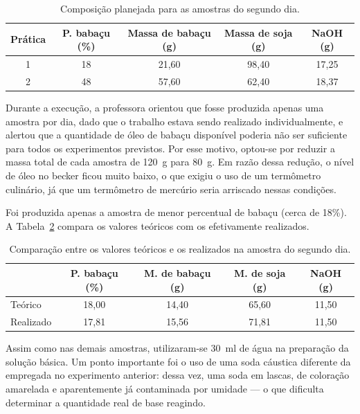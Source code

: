 \begin{table}[H]
    \centering
    \footnotesize
    \caption{Composição planejada para as amostras do segundo dia.}
    \label{tab:dia2_planejado}
    \begin{tabular}{ccccc}
        \toprule
        \textbf{Prática} & \textbf{P. babaçu (\%)} & \textbf{Massa de babaçu (g)} & \textbf{Massa de soja (g)} & \textbf{NaOH (g)} \\
        \midrule
        1 & 18 & 21,60 & 98,40 & 17,25 \\
        2 & 48 & 57,60 & 62,40 & 18,37 \\
        \bottomrule
    \end{tabular}
\end{table}

Durante a execução, a professora orientou que fosse produzida apenas uma amostra por dia, dado que o trabalho estava sendo realizado individualmente, e alertou que a quantidade de óleo de babaçu disponível poderia não ser suficiente para todos os experimentos previstos. Por esse motivo, optou-se por reduzir a massa total de cada amostra de 120~g para 80~g. Em razão dessa redução, o nível de óleo no becker ficou muito baixo, o que exigiu o uso de um termômetro culinário, já que um termômetro de mercúrio seria arriscado nessas condições.

Foi produzida apenas a amostra de menor percentual de babaçu (cerca de 18\%). A Tabela~\ref{tab:dia2_comparacao} compara os valores teóricos com os efetivamente realizados.

\begin{table}[H]
    \centering
    \footnotesize
    \caption{Comparação entre os valores teóricos e os realizados na amostra do segundo dia.}
    \label{tab:dia2_comparacao}
    \begin{tabular}{lcccc}
        \toprule
        & \textbf{P. babaçu (\%)} & \textbf{M. de babaçu (g)} & \textbf{M. de soja (g)} & \textbf{NaOH (g)} \\
        \midrule
        Teórico   & 18,00 & 14,40 & 65,60 & 11,50 \\
        Realizado & 17,81 & 15,56 & 71,81 & 11,50 \\
        \bottomrule
    \end{tabular}
\end{table}

Assim como nas demais amostras, utilizaram-se 30~ml de água na preparação da solução básica. Um ponto importante foi o uso de uma soda cáustica diferente da empregada no experimento anterior: dessa vez, uma soda em lascas, de coloração amarelada e aparentemente já contaminada por umidade — o que dificulta determinar a quantidade real de base reagindo.


